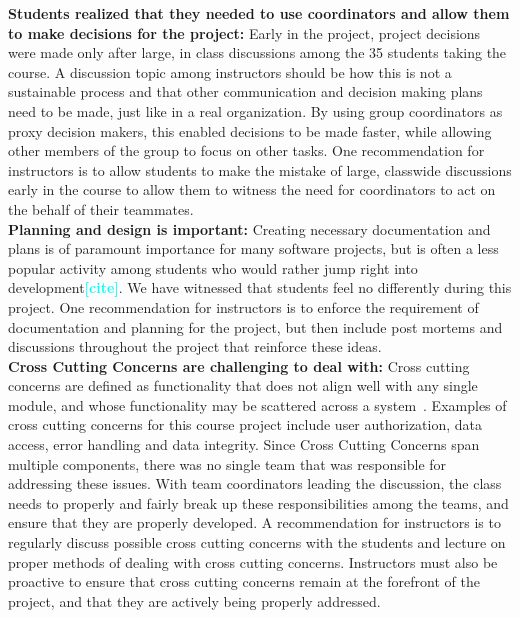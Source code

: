 \documentclass{sig-alternate-05-2015}
\newcommand{\todo}[1]{\textcolor{cyan}{\textbf{[#1]}}}
\begin{document}
\noindent
\textbf{Students realized that they needed to use coordinators and allow them to make decisions for the project:} Early in the project, project decisions were made only after large, in class discussions among the 35 students taking the course. A discussion topic among instructors should be how this is not a sustainable process and that other communication and decision making plans need to be made, just like in a real organization. By using group coordinators as proxy decision makers, this enabled decisions to be made faster, while allowing other members of the group to focus on other tasks. One recommendation for instructors is to allow students to make the mistake of large, classwide discussions early in the course to allow them to witness the need for coordinators to act on the behalf of their teammates. \\

\noindent
\textbf{Planning and design is important:} Creating necessary documentation and plans is of paramount importance for many software projects, but is often a less popular activity among students who would rather jump right into development\todo{cite}. We have witnessed that students feel no differently during this project. One recommendation for instructors is to enforce the requirement of documentation and planning for the project, but then include post mortems and discussions throughout the project that reinforce these ideas. \\


\noindent
\textbf{Cross Cutting Concerns are challenging to deal with:} Cross cutting concerns are defined as functionality that does not align well with any single module, and whose functionality may be scattered across a system~\cite{Tarr:1999:NDS:302405.302457}. Examples of cross cutting concerns for this course project include user authorization, data access, error handling and data integrity. Since Cross Cutting Concerns span multiple components, there was no single team that was responsible for addressing these issues. With team coordinators leading the discussion, the class needs to properly and fairly break up these responsibilities among the teams, and ensure that they are properly developed. A recommendation for instructors is to regularly discuss possible cross cutting concerns with the students and lecture on proper methods of dealing with cross cutting concerns. Instructors must also be proactive to ensure that cross cutting concerns remain at the forefront of the project, and that they are actively being properly addressed.
\end{document}
